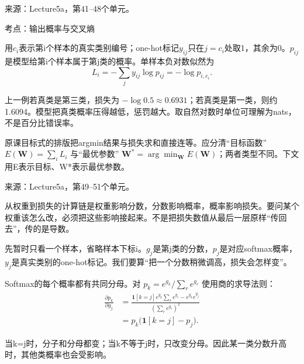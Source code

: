 来源：Lecture5a，第41–48个单元。








考点：输出概率与交叉熵
 

用\(c_i\)表示第i个样本的真实类别编号；one-hot标记\(y_{ij}\)只在\(j=c_i\)处取1，其余为0。\(p_{ij}\)是模型给第i个样本属于第j类的概率。单样本负对数似然为
\[
L_i=-\sum_j y_{ij}\log p_{ij}=-\log p_{i,c_i}.\tag{5.3}
\]


上一例若真类是第三类，损失为 \(-\log0.5\approx0.6931\)；若真类是第一类，则约1.6094。模型把真类概率压得越低，惩罚越大。取自然对数时单位可理解为nats，不是百分比错误率。


原课目标式的排版把argmin结果与损失求和直接连等。应分清“目标函数” \(E(\mathbf W)=\sum_iL_i\) 与“最优参数” \(\mathbf W^*=\arg\min_{\mathbf W}E(\mathbf W)\)；两者类型不同。下文用E表示目标、W*表示最优参数。


来源：Lecture5a，第49–51个单元。








从权重到损失的计算链是权重影响分数，分数影响概率，概率影响损失。要问某个权重该怎么改，必须把这些影响接起来。不是把损失数值从最后一层原样“传回去”，传的是导数。


先暂时只看一个样本，省略样本下标i。\(g_j\)是第j类的分数，\(p_j\)是对应softmax概率，\(y_j\)是真实类别的one-hot标记。我们要算“把一个分数稍微调高，损失会怎样变”。


Softmax的每个概率都有共同分母。对 \(p_k=e^{g_k}/\sum_r e^{g_r}\) 使用商的求导法则：
\[
\begin{aligned}\frac{\partial p_k}{\partial g_j}
&=\frac{\mathbf1[k=j]e^{g_k}\sum_r e^{g_r}-e^{g_k}e^{g_j}}{(\sum_r e^{g_r})^2}\\[4pt]
&=p_k\big(\mathbf1[k=j]-p_j\big).\end{aligned}\tag{5.4}
\]


当k=j时，分子和分母都变；当k不等于j时，只改变分母。因此某一类分数升高时，其他类概率也会受影响。



